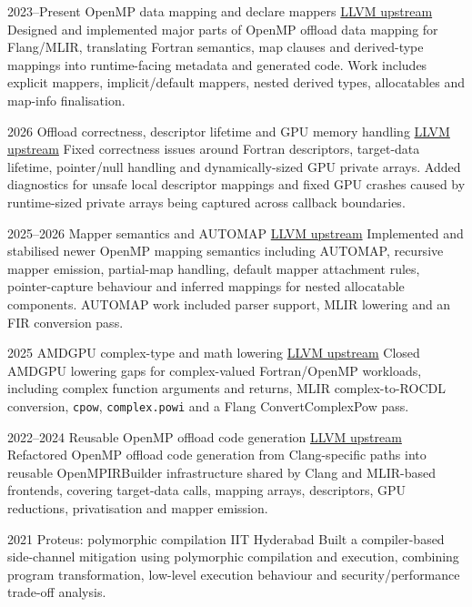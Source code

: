 \documentclass[a4paper]{cv-style}
\begin{document}
\begin{entrylist}
\entry
  {2023--Present}
  {OpenMP data mapping and declare mappers}
  {\href{https://github.com/llvm/llvm-project/commits/main/?author=TIFitis}{LLVM upstream}}
  {Designed and implemented major parts of OpenMP offload data mapping for Flang/MLIR, translating Fortran semantics, map clauses and derived-type mappings into runtime-facing metadata and generated code. Work includes explicit mappers, implicit/default mappers, nested derived types, allocatables and map-info finalisation.}

\entry
  {2026}
  {Offload correctness, descriptor lifetime and GPU memory handling}
  {\href{https://github.com/llvm/llvm-project/commits/main/?author=TIFitis}{LLVM upstream}}
  {Fixed correctness issues around Fortran descriptors, target-data lifetime, pointer/null handling and dynamically-sized GPU private arrays. Added diagnostics for unsafe local descriptor mappings and fixed GPU crashes caused by runtime-sized private arrays being captured across callback boundaries.}

\entry
  {2025--2026}
  {Mapper semantics and AUTOMAP}
  {\href{https://github.com/llvm/llvm-project/commits/main/?author=TIFitis}{LLVM upstream}}
  {Implemented and stabilised newer OpenMP mapping semantics including AUTOMAP, recursive mapper emission, partial-map handling, default mapper attachment rules, pointer-capture behaviour and inferred mappings for nested allocatable components. AUTOMAP work included parser support, MLIR lowering and an FIR conversion pass.}

\entry
  {2025}
  {AMDGPU complex-type and math lowering}
  {\href{https://github.com/llvm/llvm-project/commits/main/?author=TIFitis}{LLVM upstream}}
  {Closed AMDGPU lowering gaps for complex-valued Fortran/OpenMP workloads, including complex function arguments and returns, MLIR complex-to-ROCDL conversion, \texttt{cpow}, \texttt{complex.powi} and a Flang ConvertComplexPow pass.}

\entry
  {2022--2024}
  {Reusable OpenMP offload code generation}
  {\href{https://github.com/llvm/llvm-project/commits/main/?author=TIFitis}{LLVM upstream}}
  {Refactored OpenMP offload code generation from Clang-specific paths into reusable OpenMPIRBuilder infrastructure shared by Clang and MLIR-based frontends, covering target-data calls, mapping arrays, descriptors, GPU reductions, privatisation and mapper emission.}

\entry
  {2021}
  {Proteus: polymorphic compilation}
  {IIT Hyderabad}
  {Built a compiler-based side-channel mitigation using polymorphic compilation and execution, combining program transformation, low-level execution behaviour and security/performance trade-off analysis.}


\end{entrylist}
\end{document}
